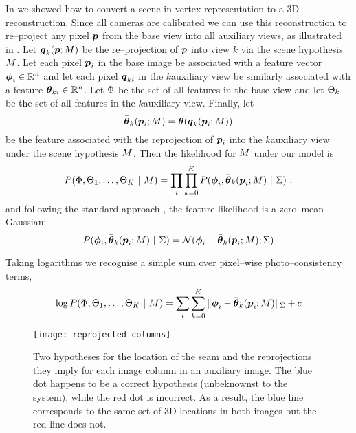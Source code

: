 In  we showed how to convert a scene in vertex
representation to a 3D reconstruction. Since all cameras are
calibrated we can use this reconstruction to re--project any pixel
$\Pixel$ from the base view into all auxiliary views, as illustrated in
. Let $\AuxPixel_k(\Pixel;\Scene)$ be the
re--projection of $\Pixel$ into view $k$ via the scene hypothesis
$\Scene$. Let each pixel $\Pixel_i$ in the base image be associated
with a feature vector $\Feature_i\in\Reals^n$ and let each pixel
$\AuxPixel_{ki}$ in the $k$\th auxiliary view be similarly associated
with a feature $\AuxFeature_{ki}\in\Reals^n$. Let $\Features$ be the
set of all features in the base view and let $\AuxFeatures_k$ be the
set of all features in the $k$\th auxiliary view. Finally, let
\begin{equation}
  \ComputedAuxFeature_k(\Pixel_i;\Scene) =
  \AuxFeature(\AuxPixel_k(\Pixel_i;\Scene))
\end{equation}
be the feature associated with the reprojection of $\Pixel_i$ into the
$k$\th auxiliary view under the scene hypothesis $\Scene$. Then the
likelihood for $\Scene$ under our model is
\begin{equation}
  P(\Features,\AuxFeatures_1,\ldots,\AuxFeatures_K ~|~ \Scene) =
    \prod_i \prod_{k=0}^{\NumViews} 
      P(\Feature_i, \ComputedAuxFeature_k(\Pixel_i;\Scene) ~|~
      \StereoCov)~.
  \label{eq:stereo-likelihood}
\end{equation}
and following the standard approach \cite{Scharstein01}, the feature
likelihood is a zero--mean Gaussian:
\begin{equation}
  P(\Feature_i, \ComputedAuxFeature_k(\Pixel_i;\Scene) ~|~ \StereoCov)
   = \NormalDistr(\Feature_i-\ComputedAuxFeature_k(\Pixel_i;\Scene); \StereoCov)
\end{equation}

Taking logarithms we recognise a simple sum over pixel--wise
photo--consistency terms,
\begin{equation}
  \label{eq:stereo-loglik}
  \log P(\Features,\AuxFeatures_1,\ldots,\AuxFeatures_{\NumViews}
            ~|~ \Scene) =
  \sum_i \sum_{k=0}^{\NumViews} 
    \|\Feature_i-\ComputedAuxFeature_k(\Pixel_i;\Scene)\|_{\StereoCov}
   +c
\end{equation}

\begin{figure}[tb]
  \centering \texttt{[image: reprojected-columns]}
  \caption{Two hypotheses for the location of the seam and the
    reprojections they imply for each image column in an auxiliary
    image. The blue dot happens to be a correct hypothesis (unbeknownst
    to the system), while the red dot is incorrect. As a result, the
    blue line corresponds to the same set of 3D locations in both
    images but the red line does not.}
  \label{fig:reprojected-columns}
\end{figure}

